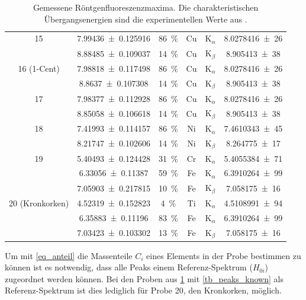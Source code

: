 \documentclass[
	a4paper,
	12pt,
	pagesize,
	ngerman
]{scrartcl}
\begin{document}
\begin{table}[H]
{\begin{tabular}{ c | c | c || c | c | c }
			15
			& \SI{7.99436+-0.125916}{} &\SI{86}{\%}& Cu & $\text{K}_\alpha$ &  \SI{8,0278416(26)}{} \\
			& \SI{8.88485+-0.109037}{} &\SI{14}{\%}&  Cu &  $\text{K}_\beta$ & \SI{8,905413(38)}{} \\
			\hline

			16 (1-Cent)
			& \SI{7.98818+-0.117498}{} &\SI{86}{\%}& Cu & $\text{K}_\alpha$ &  \SI{8,0278416(26)}{} \\
			& \SI{8.8637+-0.107308}{} &\SI{14}{\%}& Cu &  $\text{K}_\beta$ & \SI{8,905413(38)}{} \\
			\hline

			17
			& \SI{7.98377+-0.112928}{} &\SI{86}{\%}& Cu & $\text{K}_\alpha$ & \SI{8,0278416(26)}{} \\
			& \SI{8.85058+-0.106618}{} &\SI{14}{\%}& Cu & $\text{K}_\beta$ & \SI{8,905413(38)}{} \\
			\hline

			18
			& \SI{7.41993+-0.114157}{} &\SI{86}{\%}& Ni & $\text{K}_\alpha$ & \SI{7,4610343(45)}{} \\
			& \SI{8.21747+-0.102606}{} &\SI{14}{\%}& Ni & $\text{K}_\beta$ &   \SI{8,264775(17)}{} \\
			\hline

			19
			& \SI{5.40493+-0.124428}{} &\SI{31}{\%}& Cr & $\text{K}_\alpha$ & \SI{5,4055384(71)}{} \\
			& \SI{6.33056+-0.11387}{} &\SI{59}{\%}& Fe & $\text{K}_\alpha$ & \SI{ 6,3910264(99)}{} \\
			& \SI{7.05903+-0.217815}{} &\SI{10}{\%}& Fe &  $\text{K}_\beta $ & \SI{7,058175(16)}{} \\
			\hline

			20 (Kronkorken)
			& \SI{4.52319+-0.152823}{} &\SI{4}{\%}& Ti & $\text{K}_\alpha $ &  \SI{4. 5108991(94)}{} \\
			& \SI{6.35883+-0.11196}{} &\SI{83}{\%}& Fe & $\text{K}_\alpha $ &  \SI{6,3910264(99)}{} \\
			& \SI{7.03423+-0.103302}{} &\SI{13}{\%}& Fe & $\text{K}_\beta $ &  \SI{7,058175(16)}{} \\
			\hline
		\end{tabular}
		}
		\caption{Gemessene Röntgenfluoreszenzmaxima. Die charakteristischen Übergangsenergien sind die experimentellen Werte aus \cite{XRAYDB}.}
		\label{tb_peaks_unknown}

	\end{table}

	Um mit \cref{eq_anteil} die Massenteile $C_i$ eines Elements in der Probe bestimmen zu können ist es notwendig, dass alle Peaks einem Referenz-Spektrum ($H_{0i}$) zugeordnet werden können.
	Bei den Proben aus \cref{tb_peaks_unknown} mit \cref{tb_peaks_known} als Referenz-Spektrum ist dies lediglich für Probe 20, den Kronkorken, möglich.
\end{document}
